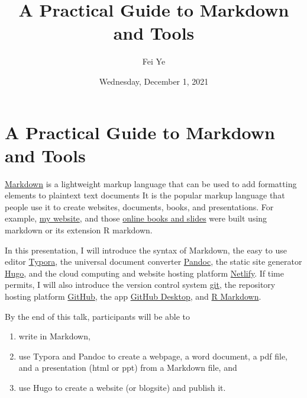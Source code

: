 \documentclass[
]{article}
\title{A Practical Guide to Markdown and Tools}
\author{Fei Ye}
\date{Wednesday, December 1, 2021}
\begin{document}
\maketitle

\hypertarget{a-practical-guide-to-markdown-and-tools}{%
\section{A Practical Guide to Markdown and
Tools}\label{a-practical-guide-to-markdown-and-tools}}

\href{https://www.markdownguide.org/getting-started/}{Markdown} is a
lightweight markup language that can be used to add formatting elements
to plaintext text documents It is the popular markup language that
people use it to create websites, documents, books, and presentations.
For example, \href{https://yfei.page}{my website}, and those
\href{https://yfei.page/teaching/\#books}{online books and slides} were
built using markdown or its extension R markdown.

In this presentation, I will introduce the syntax of Markdown, the easy
to use editor \href{https://typora.io/}{Typora}, the universal document
converter \href{http://pandoc.org/}{Pandoc}, the static site generator
\href{https://gohugo.io/getting-started/quick-start/}{Hugo}, and the
cloud computing and website hosting platform
\href{https://app.netlify.com/drop}{Netlify}. If time permits, I will
also introduce the version control system
\href{https://git-scm.com/}{git}, the repository hosting platform
\href{https://github.com/}{GitHub}, the app
\href{https://desktop.github.com/}{GitHub Desktop}, and
\href{https://rmarkdown.rstudio.com/}{R Markdown}.

By the end of this talk, participants will be able to

\begin{enumerate}
\def\labelenumi{\arabic{enumi}.}
\item
  write in Markdown,
\item
  use Typora and Pandoc to create a webpage, a word document, a pdf
  file, and a presentation (html or ppt) from a Markdown file, and
\item
  use Hugo to create a website (or blogsite) and publish it.
\end{enumerate}
\end{document}

